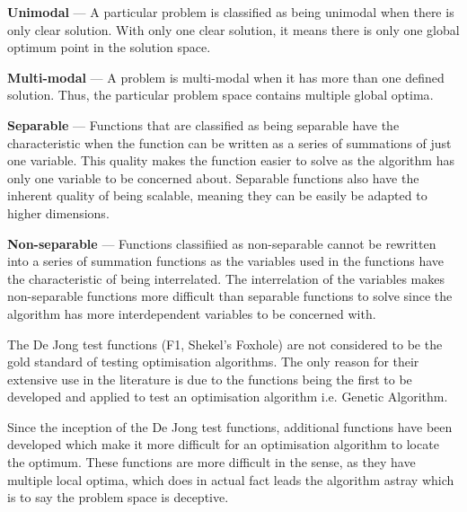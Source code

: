 \begin{description}
\item{\textbf{Unimodal}} --- A particular problem is classified as being unimodal when there is only clear solution. With only one clear solution, it means there is only one global optimum point in the solution space\cite{evalevoalgo,numericalABC,FundamentalSwarm,CompuIntelligenceIntro}.
\item{\textbf{Multi-modal}} --- A problem is multi-modal when it has more than one defined solution. Thus, the particular problem space contains multiple global optima\cite{evalevoalgo,numericalABC,FundamentalSwarm,CompuIntelligenceIntro}.
\item{\textbf{Separable}} --- Functions that are classified as being separable have the characteristic when the function can be written as a series of summations of just one variable\cite{numericalABC}. This quality makes the function easier to solve as the algorithm has only one variable to be concerned about\cite{evalevoalgo,numericalABC}. Separable functions also have the inherent quality of being scalable, meaning they can be easily be adapted to higher dimensions\cite{evalevoalgo,numericalABC}.
\item{\textbf{Non-separable}} --- Functions classifiied as non-separable cannot be rewritten into a series of summation functions as the variables used in the functions have the characteristic of being interrelated\cite{evalevoalgo,numericalABC}. The interrelation of the variables makes non-separable functions more difficult than separable functions to solve since the algorithm has more interdependent variables to be concerned with\cite{evalevoalgo,numericalABC}.
\end{description}

The De Jong test functions (F1, Shekel's Foxhole) are not considered to be the gold standard of testing optimisation algorithms\cite{evalevoalgo}. The only reason for their extensive use in the literature is due to the functions being the first to be developed and applied to test an optimisation algorithm i.e. Genetic Algorithm\cite{devparallelgasa,evalevoalgo}.

Since the inception of the De Jong test functions, additional functions have been developed which make it more difficult for an optimisation algorithm to locate the optimum\cite{evalevoalgo}. These functions are more difficult in the sense, as they have multiple local optima, which does in actual fact leads the algorithm astray which is to say the problem space is deceptive\cite{CompuIntelligenceIntro,FundamentalSwarm,evalevoalgo}. 

